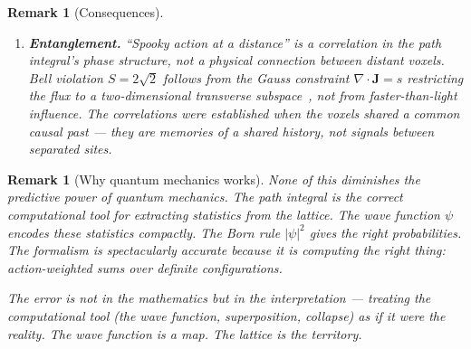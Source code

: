 \documentclass[11pt]{article}
\theoremstyle{tight}
\theoremstyle{plainroman}
\newtheorem{remark}[theorem]{Remark}
\begin{document}
\begin{remark}[Consequences]
\begin{enumerate}[nosep]
\item \textbf{Entanglement.}
``Spooky action at a distance'' is a correlation in the path integral's phase structure, not a physical connection between distant voxels.
Bell violation $S=2\sqrt{2}$ follows from the Gauss constraint $\nabla\!\cdot\!\mathbf J=s$ restricting the flux to a two-dimensional transverse subspace~\cite{ftdspec}, not from faster-than-light influence.
The correlations were established when the voxels shared a common causal past --- they are \emph{memories} of a shared history, not signals between separated sites.
\end{enumerate}
\end{remark}

\begin{remark}[Why quantum mechanics works]
None of this diminishes the predictive power of quantum mechanics.
The path integral is the correct computational tool for extracting statistics from the lattice.
The wave function $\psi$ encodes these statistics compactly.
The Born rule $|\psi|^2$ gives the right probabilities.
The formalism is spectacularly accurate because it \emph{is} computing the right thing: action-weighted sums over definite configurations.

The error is not in the mathematics but in the interpretation --- treating the computational tool (the wave function, superposition, collapse) as if it were the reality.
The wave function is a map.
The lattice is the territory.
\end{remark}
\end{document}
